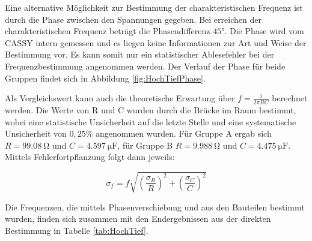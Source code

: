 \documentclass[12pt,a4paper]{article}
\begin{document}
Eine alternative Möglichkeit zur Bestimmung der charakteristischen Frequenz ist durch die Phase zwischen den Spannungen gegeben. Bei erreichen der charakteristischen Frequenz beträgt die Phasendifferenz $\ang{45}$. Die Phase wird vom CASSY intern gemessen und es liegen keine Informationen zur Art und Weise der Bestimmung vor. Es kann somit nur ein statistischer Ablesefehler bei der Frequenzbestimmung angenommen werden. Der Verlauf der Phase für beide Gruppen findet sich in Abbildung \ref{fig:HochTiefPhase}.

Als Vergleichswert kann auch die theoretische Erwartung über $f = \frac{1}{2\pi RC}$ berechnet werden. Die Werte von R und C wurden durch die Brücke im Raum bestimmt, wobei eine statistische Unsicherheit auf die letzte Stelle und eine systematische Unsicherheit von $0,25$\% angenommen wurden. Für Gruppe A ergab sich $R=\SI{99,08}{\ohm}$ und $C=\SI{4,597}{\micro \F}$, für Gruppe B $R=\SI{9,988}{\ohm}$ und $C=\SI{4,475}{\micro \F}$. Mittels Fehlerfortpflanzung folgt dann jeweils:

\begin{equation}
\sigma_f = f \sqrt{\left( \frac{\sigma_R}{R} \right)^2+\left( \frac{\sigma_C}{C} \right)^2}
\end{equation}

Die Frequenzen, die mittels Phasenverschiebung und aus den Bauteilen bestimmt wurden, finden sich zusammen mit den Endergebnissen aus der direkten Bestimmung in Tabelle \ref{tab:HochTief}.
\end{document}
